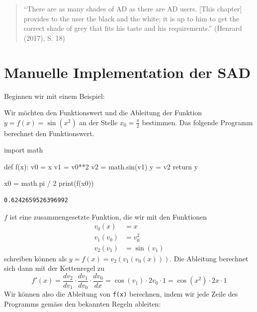 \documentclass[
  letterpaper,
  DIV=11,
  oneside]{scrreprt}
\newenvironment{Shaded}{\begin{snugshade}}{\end{snugshade}}
\newcommand{\BuiltInTok}[1]{\textcolor[rgb]{0.00,0.23,0.31}{#1}}
\newcommand{\ControlFlowTok}[1]{\textcolor[rgb]{0.00,0.23,0.31}{#1}}
\newcommand{\DecValTok}[1]{\textcolor[rgb]{0.68,0.00,0.00}{#1}}
\newcommand{\ImportTok}[1]{\textcolor[rgb]{0.00,0.46,0.62}{#1}}
\newcommand{\KeywordTok}[1]{\textcolor[rgb]{0.00,0.23,0.31}{#1}}
\newcommand{\NormalTok}[1]{\textcolor[rgb]{0.00,0.23,0.31}{#1}}
\newcommand{\OperatorTok}[1]{\textcolor[rgb]{0.37,0.37,0.37}{#1}}
\theoremstyle{definition}
\theoremstyle{definition}
\theoremstyle{remark}
\begin{document}
\begin{quote}
``There are as many shades of AD as there are AD users. {[}This
chapter{]} provides to the user the black and the white; it is up to him
to get the correct shade of grey that fits his taste and his
requirements.'' (Henrard (2017), S. 18)
\end{quote}

\hypertarget{sec-SadManualImplementation}{%
\section{Manuelle Implementation der
SAD}\label{sec-SadManualImplementation}}

Beginnen wir mit einem Beispiel:

Wir möchten den Funktionswert und die Ableitung der Funktion
\(y=f(x)=\sin(x^2)\) an der Stelle \(x_0=\frac{\pi}{2}\) bestimmen. Das
folgende Programm berechnet den Funktionswert.

\begin{Shaded}
\begin{Highlighting}[]
\ImportTok{import}\NormalTok{ math}

\KeywordTok{def}\NormalTok{ f(x):}
\NormalTok{    v0 }\OperatorTok{=}\NormalTok{ x}
\NormalTok{    v1 }\OperatorTok{=}\NormalTok{ v0}\OperatorTok{**}\DecValTok{2}
\NormalTok{    v2 }\OperatorTok{=}\NormalTok{ math.sin(v1)}
\NormalTok{    y }\OperatorTok{=}\NormalTok{ v2}
    \ControlFlowTok{return}\NormalTok{ y}

\NormalTok{x0 }\OperatorTok{=}\NormalTok{ math.pi }\OperatorTok{/} \DecValTok{2}
\BuiltInTok{print}\NormalTok{(f(x0))}
\end{Highlighting}
\end{Shaded}

\begin{verbatim}
0.6242659526396992
\end{verbatim}

\(f\) ist eine zusammengesetzte Funktion, die wir mit den Funktionen \[
\begin{align}
    v_0(x)   &= x \\
    v_1(v_0) &= v_0 ^2 \\
    v_2(v_1) &= \sin(v_1)
\end{align}
\] schreiben können als \(y=f(x)=v_2(v_1(v_0(x)))\). Die Ableitung
berechnet sich dann mit der Kettenregel zu \[
f'(x) = \frac{dv_2}{dv_1} \cdot \frac{dv_1}{dv_0} \cdot \frac{dv_0}{dx} = \cos(v_1)\cdot 2v_0 \cdot 1 = \cos(x^2) \cdot 2x \cdot 1
\] Wir können also die Ableitung von \texttt{f(x)} berechnen, indem wir
jede Zeile des Programms gemäss den bekannten Regeln ableiten:
\end{document}
